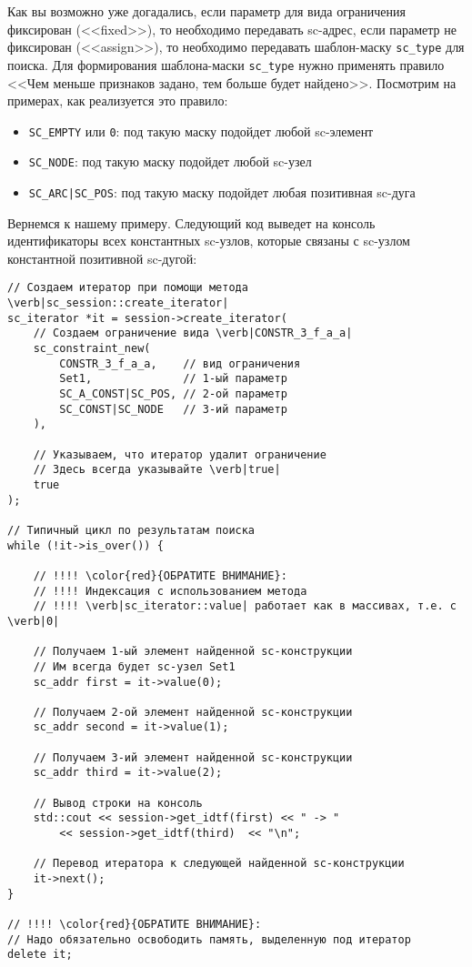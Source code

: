 Как вы возможно уже догадались, если параметр для вида ограничения
фиксирован (<<fixed>>), то необходимо передавать sc-адрес, если
параметр не фиксирован (<<assign>>), то необходимо передавать
шаблон-маску \lstinline|sc_type| для поиска. Для формирования
шаблона-маски \lstinline|sc_type| нужно применять правило <<Чем меньше
признаков задано, тем больше будет найдено>>. Посмотрим на примерах,
как реализуется это правило:

\begin{itemize}
\item \lstinline+SC_EMPTY+ или \lstinline+0+: под такую маску подойдет
  любой sc-элемент
\item \lstinline+SC_NODE+: под такую маску подойдет любой sc-узел
\item \lstinline+SC_ARC|SC_POS+: под такую маску подойдет любая
  позитивная sc-дуга
\end{itemize}

Вернемся к нашему примеру. Следующий код выведет на консоль
идентификаторы всех константных sc-узлов, которые связаны с sc-узлом
 константной позитивной sc-дугой:

\begin{lstlisting}[texcl]
// Создаем итератор при помощи метода \verb|sc_session::create_iterator|
sc_iterator *it = session->create_iterator(
    // Создаем ограничение вида \verb|CONSTR_3_f_a_a|
    sc_constraint_new(
        CONSTR_3_f_a_a,    // вид ограничения
        Set1,              // 1-ый параметр
        SC_A_CONST|SC_POS, // 2-ой параметр
        SC_CONST|SC_NODE   // 3-ий параметр
    ),

    // Указываем, что итератор удалит ограничение
    // Здесь всегда указывайте \verb|true|
    true
);

// Типичный цикл по результатам поиска
while (!it->is_over()) {

    // !!!! \color{red}{ОБРАТИТЕ ВНИМАНИЕ}:
    // !!!! Индексация с использованием метода
    // !!!! \verb|sc_iterator::value| работает как в массивах, т.е. с \verb|0|

    // Получаем 1-ый элемент найденной sc-конструкции
    // Им всегда будет sc-узел Set1
    sc_addr first = it->value(0);

    // Получаем 2-ой элемент найденной sc-конструкции
    sc_addr second = it->value(1);

    // Получаем 3-ий элемент найденной sc-конструкции
    sc_addr third = it->value(2);

    // Вывод строки на консоль
    std::cout << session->get_idtf(first) << " -> "
        << session->get_idtf(third)  << "\n";

    // Перевод итератора к следующей найденной sc-конструкции
    it->next();
}

// !!!! \color{red}{ОБРАТИТЕ ВНИМАНИЕ}:
// Надо обязательно освободить память, выделенную под итератор
delete it;
\end{lstlisting}


